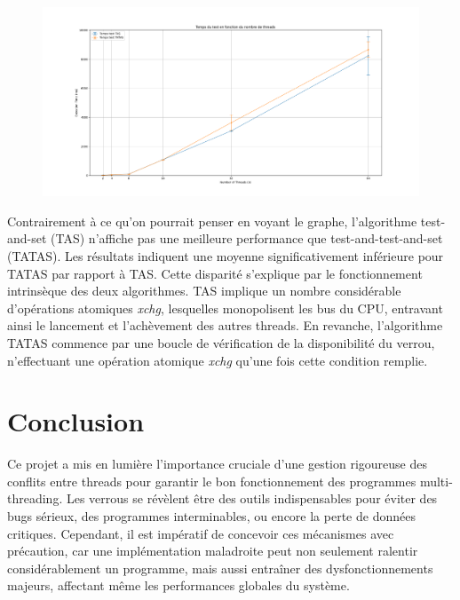 \documentclass[12pt,titlepage]{article}
\begin{document}
\begin{figure}[H]
\includegraphics[width=\textwidth, keepaspectratio]{Temps_TAS_TATAS.png}
\centering
\end{figure}

Contrairement à ce qu'on pourrait penser en voyant le graphe, l'algorithme test-and-set (TAS) n'affiche pas une meilleure performance que test-and-test-and-set (TATAS). Les résultats indiquent une moyenne significativement inférieure pour TATAS par rapport à TAS. Cette disparité s'explique par le fonctionnement intrinsèque des deux algorithmes. TAS implique un nombre considérable d'opérations atomiques \emph{xchg}, lesquelles monopolisent les bus du CPU, entravant ainsi le lancement et l'achèvement des autres threads. En revanche, l'algorithme TATAS commence par une boucle de vérification de la disponibilité du verrou, n'effectuant une opération atomique \emph{xchg} qu'une fois cette condition remplie.

\section{Conclusion}

Ce projet a mis en lumière l'importance cruciale d'une gestion rigoureuse des conflits entre threads pour garantir le bon fonctionnement des programmes multi-threading. Les verrous se révèlent être des outils indispensables pour éviter des bugs sérieux, des programmes interminables, ou encore la perte de données critiques. Cependant, il est impératif de concevoir ces mécanismes avec précaution, car une implémentation maladroite peut non seulement ralentir considérablement un programme, mais aussi entraîner des dysfonctionnements majeurs, affectant même les performances globales du système.
\end{document}
